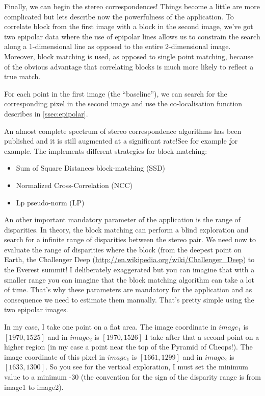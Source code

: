 Finally, we can begin the stereo correspondences! Things become a little are
more complicated but lets describe now the powerfulness of the
 application.  To correlate block from the first
image with a block in the second image, we've got two epipolar data where the
use of epipolar lines allows us to constrain the search along a 1-dimensional
line as opposed to the entire 2-dimensional image. Moreover, block matching is
used, as opposed to single point matching, because of the obvious advantage that
correlating blocks is much more likely to reflect a true match.

For each point in the first image (the ``baseline''), we can search for the
corresponding pixel in the second image and use the co-localisation function
describes in \ref{ssec:epipolar}.

An almost complete spectrum of stereo correspondence algorithms has been
published and it is still augmented at a significant rate!See for example
\href{http://en.wikipedia.org/wiki/Block-matching_algorithm} for example. The
\otb implements different strategies for block matching:

\begin{itemize}
\item Sum of Square Distances block-matching (SSD)
\item Normalized Cross-Correlation (NCC)
\item Lp pseudo-norm (LP)
\end{itemize}

An other important mandatory parameter of the application is the range of
disparities. In theory, the block matching can perform a blind exploration and
search for a infinite range of disparities between the stereo pair. We need now
to evaluate the range of disparities where the block (from the deepest point on
Earth, the Challenger Deep (\url{http://en.wikipedia.org/wiki/Challenger_Deep})
to the Everest summit!  I deliberately exaggerated but you can imagine that with
a smaller range you can imagine that the block matching algorithm can take a lot
of time.  That's why these parameters are mandatory for the application and as
consequence we need to estimate them manually. That's pretty simple using the
two epipolar images.

In my case, I take one point on a flat area. The image coordinate in $image_{1}$
is $[1970,1525]$ and in $image_{2}$ is $[1970,1526]$ I take after that a second
point on a higher region (in my case a point near the top of the Pyramid of
Cheops!). The image coordinate of this pixel in $image_{1}$ is $[1661,1299]$ and
in $image_{2}$ is $[1633,1300]$.  So you see for the vertical exploration, I
must set the minimum value to a minimum -30 (the convention for the sign of the
disparity range is from image1 to image2).

